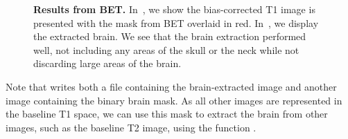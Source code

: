 \begin{figure}
\hfill
\caption{{\bf Results from BET.} In~\protect{}, we show the bias-corrected T1 image is presented with the mask from BET overlaid in red.  In~\protect{}, we display the extracted brain.  We see that the brain extraction performed well, not including any areas of the skull or the neck while not discarding large areas of the brain.}
\label{fig:bet}
\end{figure}

Note that  writes both a file containing the brain-extracted image and another image containing the binary brain mask.  As all other images are represented in the baseline T1 space, we can use this mask to extract the brain from other images, such as the baseline T2 image, using the  function .

\begin{knitrout}
\color{fgcolor}\begin{kframe}
\begin{alltt}
\hlstd{(}\hlstd{=}\hlstd{,}
         \hlstd{=} \hlstd{,}
         \hlstd{=} \hlstd{)}
\end{alltt}
\end{kframe}
\end{knitrout}
\gobblepars


